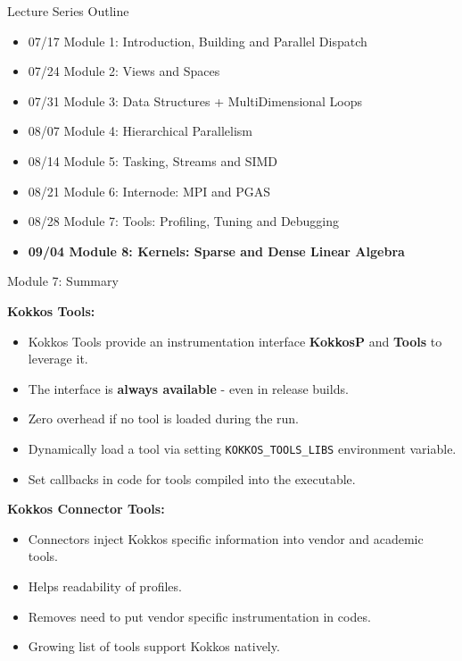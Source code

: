 \begin{frame}[fragile]{Lecture Series Outline}

\begin{itemize}
        \item 07/17 Module 1: Introduction, Building and Parallel Dispatch
        \item 07/24 Module 2: Views and Spaces
        \item 07/31 Module 3: Data Structures + MultiDimensional Loops
        \item 08/07 Module 4: Hierarchical Parallelism
        \item 08/14 Module 5: Tasking, Streams and SIMD
        \item 08/21 Module 6: Internode: MPI and PGAS
        \item 08/28 Module 7: Tools: Profiling, Tuning and Debugging
        \item \textbf{09/04 Module 8: Kernels: Sparse and Dense Linear Algebra}
\end{itemize}

\end{frame}

\begin{frame}[fragile]{Module 7: Summary}

\textbf{Kokkos Tools:}
\begin{itemize}
  \item Kokkos Tools provide an instrumentation interface \textbf{KokkosP} and \textbf{Tools} to leverage it.
  \item The interface is \textbf{always available} - even in release builds.
  \item Zero overhead if no tool is loaded during the run.
  \item Dynamically load a tool via setting \texttt{KOKKOS\_TOOLS\_LIBS} environment variable.
  \item Set callbacks in code for tools compiled into the executable. 
\end{itemize}

\textbf{Kokkos Connector Tools:}
\begin{itemize}
  \item Connectors inject Kokkos specific information into vendor and academic tools.
  \item Helps readability of profiles.
  \item Removes need to put vendor specific instrumentation in codes.
  \item Growing list of tools support Kokkos natively.
\end{itemize}
\end{frame}

